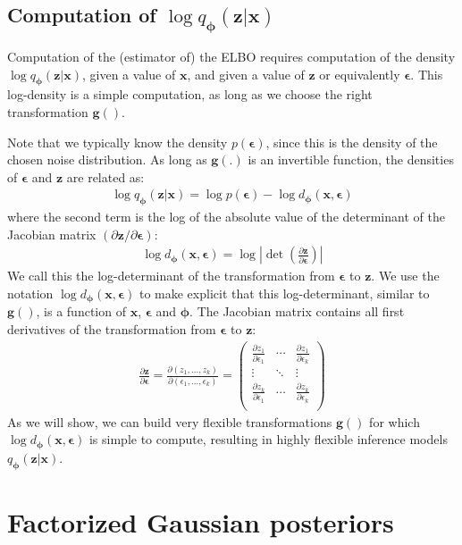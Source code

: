 \documentclass[MAL,biber]{nowfnt} %
\newcommand{\bb}[1]{\mathbf{#1}}
\newcommand{\bx}{\bb{x}}
\newcommand{\bg}{\bb{g}}
\newcommand{\bz}{\bb{z}}
\newcommand{\bphi}{\boldsymbol{\phi}}
\newcommand{\beps}{\boldsymbol{\epsilon}}
\newcommand{\qP}{q_{\bphi}}
\newcommand{\dP}{d_{\bphi}}
\begin{document}
\subsection{Computation of $\log \qP(\bz|\bx)$}
\label{sec:posteriordensity}

Computation of the (estimator of) the ELBO requires computation of the density $\log \qP(\bz|\bx)$, given a value of $\bx$, and given a value of $\bz$ or equivalently $\beps$. This log-density is a simple computation, as long as we choose the right transformation $\bg()$.

Note that we typically know the density $p(\beps)$, since this is the density of the chosen noise distribution. As long as $\bg(.)$ is an invertible function, the densities of $\beps$ and $\bz$ are related as:
\begin{align}
\log \qP(\bz|\bx) = \log p(\beps) - \log \dP(\bx,\beps)
\end{align}
where the second term is the log of the absolute value of the determinant of the Jacobian matrix $(\partial \bz / \partial \beps)$:
\begin{align}
\log \dP(\bx,\beps) =  \log \left| \det \left(\frac{\partial \bz}{ \partial \beps} \right) \right|
\end{align}
We call this the log-determinant of the transformation from $\beps$ to $\bz$.  We use the notation $\log \dP(\bx,\beps)$ to make explicit that this log-determinant, similar to $\bg()$, is a function of $\bx$, $\beps$ and $\bphi$. The Jacobian matrix contains all first derivatives of the transformation from $\beps$ to $\bz$:
\begin{align}
\frac{\partial \bz}{\partial \beps}
= \frac{\partial (z_1,...,z_k)}{\partial (\epsilon_1,...,\epsilon_k)}
= \begin{pmatrix}
\frac{\partial z_1}{\partial \epsilon_1} & \cdots & \frac{\partial z_1}{\partial \epsilon_k} \\
\vdots  & \ddots & \vdots  \\
\frac{\partial z_k}{\partial \epsilon_1} & \cdots & \frac{\partial z_k}{\partial \epsilon_k} \\
\end{pmatrix}
\end{align}
As we will show, we can build very flexible transformations $\bg()$ for which $\log \dP(\bx,\beps)$ is simple to compute, resulting in highly flexible inference models $\qP(\bz|\bx)$.

\section{Factorized Gaussian posteriors}
\end{document}
